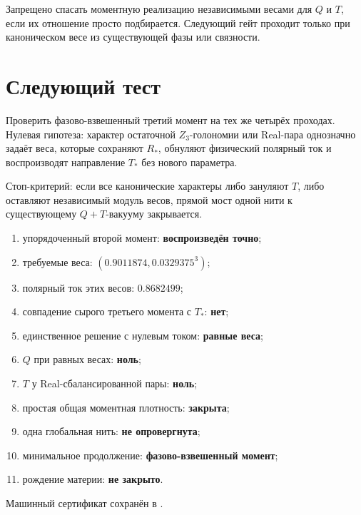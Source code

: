 \begin{nogocriterion}
Запрещено спасать моментную реализацию независимыми весами для $Q$ и $T$,
если их отношение просто подбирается. Следующий гейт проходит только при
каноническом весе из существующей фазы или связности.
\end{nogocriterion}

\section{Следующий тест}

Проверить фазово-взвешенный третий момент на тех же четырёх проходах.
Нулевая гипотеза: характер остаточной $Z_3$-голономии или Real-пара
однозначно задаёт веса, которые сохраняют $R_*$, обнуляют физический
полярный ток и воспроизводят направление $T_*$ без нового параметра.

Стоп-критерий: если все канонические характеры либо зануляют $T$, либо
оставляют независимый модуль весов, прямой мост одной нити к существующему
$Q+T$-вакууму закрывается.

\begin{protocol}
\begin{enumerate}
 \item упорядоченный второй момент: \textbf{воспроизведён точно};
 \item требуемые веса: \textbf{$(0.9011874,0.0329375^3)$};
 \item полярный ток этих весов: \textbf{$0.8682499$};
 \item совпадение сырого третьего момента с $T_*$: \textbf{нет};
 \item единственное решение с нулевым током: \textbf{равные веса};
 \item $Q$ при равных весах: \textbf{ноль};
 \item $T$ у Real-сбалансированной пары: \textbf{ноль};
 \item простая общая моментная плотность: \textbf{закрыта};
 \item одна глобальная нить: \textbf{не опровергнута};
 \item минимальное продолжение: \textbf{фазово-взвешенный момент};
 \item рождение материи: \textbf{не закрыто}.
\end{enumerate}
\end{protocol}

Машинный сертификат сохранён в
.

